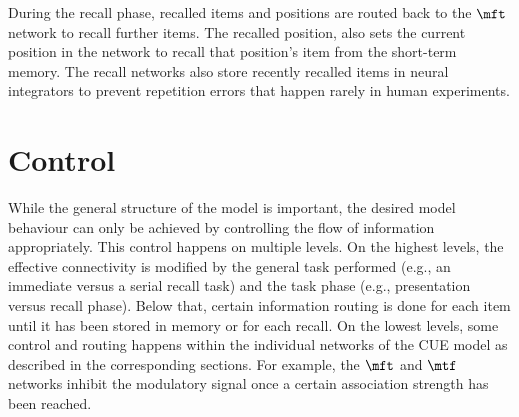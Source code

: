 During the recall phase, recalled items and positions are routed back to the $\mft$ network to recall further items.
The recalled position, also sets the current position in the  network to recall that position's item from the  short-term memory.
The recall networks also store recently recalled items in neural integrators to prevent repetition errors that happen rarely in human experiments.



\section{Control}\label{sec:control}
While the general structure of the model is important, the desired model behaviour can only be achieved by controlling the flow of information appropriately.
This control happens on multiple levels.
On the highest levels, the effective connectivity is modified by the general task performed (e.g., an immediate versus a serial recall task) and the task phase (e.g., presentation versus recall phase).
Below that, certain information routing is done for each item until it has been stored in memory or for each recall.
On the lowest levels, some control and routing happens within the individual networks of the CUE model as described in the corresponding sections.
For example, the $\mft$ and $\mtf$ networks inhibit the modulatory signal once a certain association strength has been reached.


